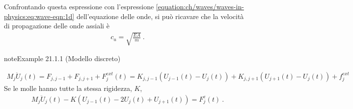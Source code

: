 \documentclass[letterpaper,10pt,italian]{jupyterBook}
\begin{document}
\sphinxAtStartPar
Confrontando questa espressione con l’espressione \eqref{equation:ch/waves/waves-in-physics:eq:wave-eqn:1d} dell’equazione delle onde, si può ricavare che la velocità di propagazione delle onde assiali è
\begin{equation*}
\begin{split}c_{u} = \sqrt{\frac{EA}{m}} \ .\end{split}
\end{equation*}\label{ch/waves/waves-in-physics:example-0}
\begin{sphinxadmonition}{note}{Example 21.1.1 (Modello discreto)}


\begin{equation*}
\begin{split}M_j \ddot{U}_j(t) = F_{j,j-1} + F_{j,j+1} + F_j^{ext}(t) = K_{j,j-1} \left( U_{j-1}(t) - U_j(t) \right) + K_{j,j+1} \left( U_{j+1}(t) - U_{j}(t) \right) + f_j^{ext}\end{split}
\end{equation*}
\sphinxAtStartPar
Se le molle hanno tutte la stessa rigidezza, \(K\),
\begin{equation}\label{equation:ch/waves/waves-in-physics:eq:axial:discrete:index}
\begin{split}M_j \ddot{U}_j(t) - K \left( U_{j-1}(t) - 2 U_j(t) + U_{j+1}(t) \right) =  F^e_j(t) \ .\end{split}
\end{equation}
\sphinxAtStartPar
{}


\end{sphinxadmonition}
\end{document}
